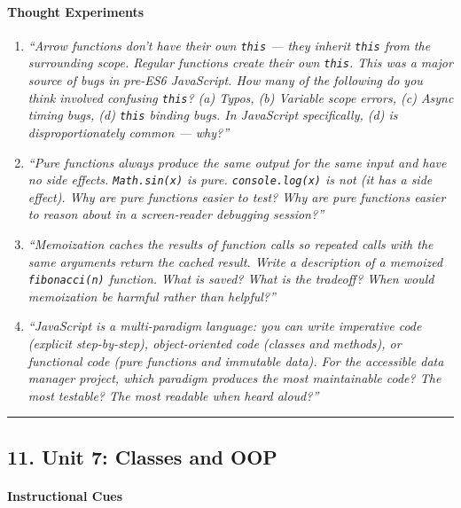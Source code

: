 \documentclass[
  justified,
  openright,
]{tufte-book}
\let\paragraph\paragraph
\let\paragraph\paragraph
\begin{document}
\paragraph{Thought Experiments}\label{thought-experiments-7}

\begin{enumerate}
\def\labelenumi{\arabic{enumi}.}
\item
  \emph{``Arrow functions don't have their own \texttt{this} --- they
  inherit \texttt{this} from the surrounding scope. Regular functions
  create their own \texttt{this}. This was a major source of bugs in
  pre-ES6 JavaScript. How many of the following do you think involved
  confusing \texttt{this}? (a) Typos, (b) Variable scope errors, (c)
  Async timing bugs, (d) \texttt{this} binding bugs. In JavaScript
  specifically, (d) is disproportionately common --- why?''}
\item
  \emph{``Pure functions always produce the same output for the same
  input and have no side effects. \texttt{Math.sin(x)} is pure.
  \texttt{console.log(x)} is not (it has a side effect). Why are pure
  functions easier to test? Why are pure functions easier to reason
  about in a screen-reader debugging session?''}
\item
  \emph{``Memoization caches the results of function calls so repeated
  calls with the same arguments return the cached result. Write a
  description of a memoized \texttt{fibonacci(n)} function. What is
  saved? What is the tradeoff? When would memoization be harmful rather
  than helpful?''}
\item
  \emph{``JavaScript is a multi-paradigm language: you can write
  imperative code (explicit step-by-step), object-oriented code (classes
  and methods), or functional code (pure functions and immutable data).
  For the accessible data manager project, which paradigm produces the
  most maintainable code? The most testable? The most readable when
  heard aloud?''}
\end{enumerate}

\begin{center}\rule{0.5\linewidth}{0.5pt}\end{center}

\subsection{11. Unit 7: Classes and OOP}\label{unit-7-classes-and-oop}

\paragraph{Instructional Cues}\label{instructional-cues-7}
\end{document}

